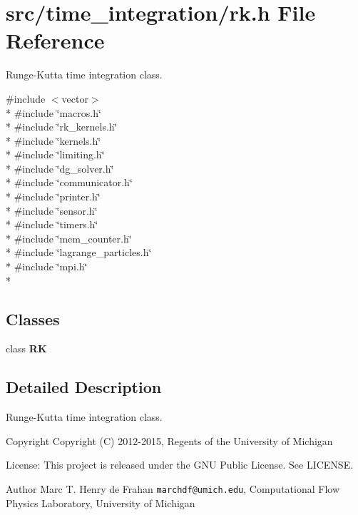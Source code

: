\section{src/time\-\_\-integration/rk.h File Reference}
\label{rk_8h}


Runge-\/\-Kutta time integration class.  


{\ttfamily \#include $<$vector$>$}\\*
{\ttfamily \#include \char`\"{}macros.\-h\char`\"{}}\\*
{\ttfamily \#include \char`\"{}rk\-\_\-kernels.\-h\char`\"{}}\\*
{\ttfamily \#include \char`\"{}kernels.\-h\char`\"{}}\\*
{\ttfamily \#include \char`\"{}limiting.\-h\char`\"{}}\\*
{\ttfamily \#include \char`\"{}dg\-\_\-solver.\-h\char`\"{}}\\*
{\ttfamily \#include \char`\"{}communicator.\-h\char`\"{}}\\*
{\ttfamily \#include \char`\"{}printer.\-h\char`\"{}}\\*
{\ttfamily \#include \char`\"{}sensor.\-h\char`\"{}}\\*
{\ttfamily \#include \char`\"{}timers.\-h\char`\"{}}\\*
{\ttfamily \#include \char`\"{}mem\-\_\-counter.\-h\char`\"{}}\\*
{\ttfamily \#include \char`\"{}lagrange\-\_\-particles.\-h\char`\"{}}\\*
{\ttfamily \#include \char`\"{}mpi.\-h\char`\"{}}\\*
\subsection*{Classes}
\begin{DoxyCompactItemize}
\item 
class {\bf R\-K}
\end{DoxyCompactItemize}


\subsection{Detailed Description}
Runge-\/\-Kutta time integration class. \begin{DoxyCopyright}{Copyright}
Copyright (C) 2012-\/2015, Regents of the University of Michigan 
\end{DoxyCopyright}
\begin{DoxyParagraph}{License\-:}
This project is released under the G\-N\-U Public License. See L\-I\-C\-E\-N\-S\-E. 
\end{DoxyParagraph}
\begin{DoxyAuthor}{Author}
Marc T. Henry de Frahan {\tt marchdf@umich.\-edu}, Computational Flow Physics Laboratory, University of Michigan 
\end{DoxyAuthor}
